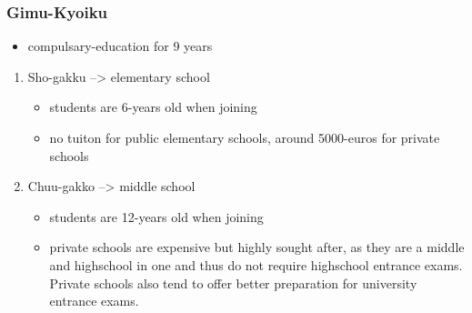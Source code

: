 \documentclass{article}
\begin{document}
\subsubsection{ Gimu-Kyoiku}
\begin{itemize}
\item compulsary-education for 9 years
\end{itemize}
\begin{enumerate}
\item Sho-gakku --> elementary school
\begin{itemize}
\item students are 6-years old when joining
\item no tuiton for public elementary schools, around 5000-euros for private schools
\end{itemize}
\item Chuu-gakko --> middle school
\begin{itemize}
\item students are 12-years old when joining
\item private schools are expensive but highly sought after, as they are a middle and highschool in one and thus do not require highschool entrance exams. Private schools also tend to offer better preparation for university entrance exams.
\end{itemize}
\end{enumerate}
\end{document}
